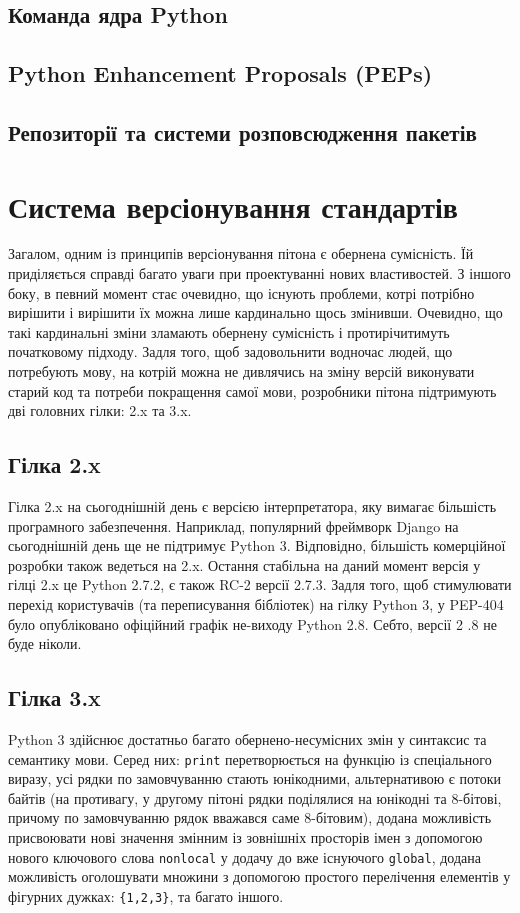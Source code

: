 \documentclass[a4paper, 12pt, onsedie]{article}
\begin{document}
\subsection{Команда ядра Python}

\subsection{Python Enhancement Proposals (PEPs)}

\subsection{Репозиторії та системи розповсюдження пакетів}

\section{Система версіонування стандартів}
Загалом, одним із принципів версіонування пітона є обернена сумісність. Їй приділяється 
справді багато уваги при проектуванні нових властивостей. З іншого боку, в певний момент 
стає очевидно, що існують проблеми, котрі потрібно вирішити і вирішити їх можна лише 
кардинально щось змінивши. Очевидно, що такі кардинальні зміни зламають обернену сумісність
і протирічитимуть початковому підходу. Задля того, щоб задовольнити водночас людей, що 
потребують мову, на котрій можна не дивлячись на зміну версій виконувати старий код та 
потреби покращення самої мови, розробники пітона підтримують дві головних гілки: 2.x та 3.x.


\subsection{Гілка 2.x}
Гілка 2.x на сьогоднішній день є версією інтерпретатора, яку вимагає більшість програмного
забезпечення. Наприклад, популярний фреймворк Django на сьогоднішній день ще не підтримує
Python 3. Відповідно, більшість комерційної розробки також ведеться на 2.x.
Остання стабільна на даний момент версія у гілці 2.x це Python 2.7.2, є також RC-2 версії 2.7.3.
Задля того, щоб стимулювати перехід користувачів (та переписування бібліотек) на гілку 
Python 3, у PEP-404 було опубліковано офіційний графік не-виходу Python 2.8. Себто, версії 2
.8 не буде ніколи. 

\subsection{Гілка 3.x}
Python 3 здійснює достатньо багато обернено-несумісних змін у синтаксис та семантику мови.
Серед них: \texttt{print} перетворюється на функцію із спеціального виразу, усі рядки по
замовчуванню стають юнікодними, альтернативою є потоки байтів (на противагу, у другому
пітоні рядки поділялися на юнікодні та 8-бітові, причому по замовчуванню рядок вважався
саме 8-бітовим), додана можливість присвоювати нові значення змінним із зовнішніх просторів
імен з допомогою нового ключового слова \texttt{nonlocal} у додачу до вже існуючого 
\texttt{global}, додана можливість оголошувати множини з допомогою простого перелічення
елементів у фігурних дужках: \texttt{\{1,2,3\}}, та багато іншого.
\end{document}
